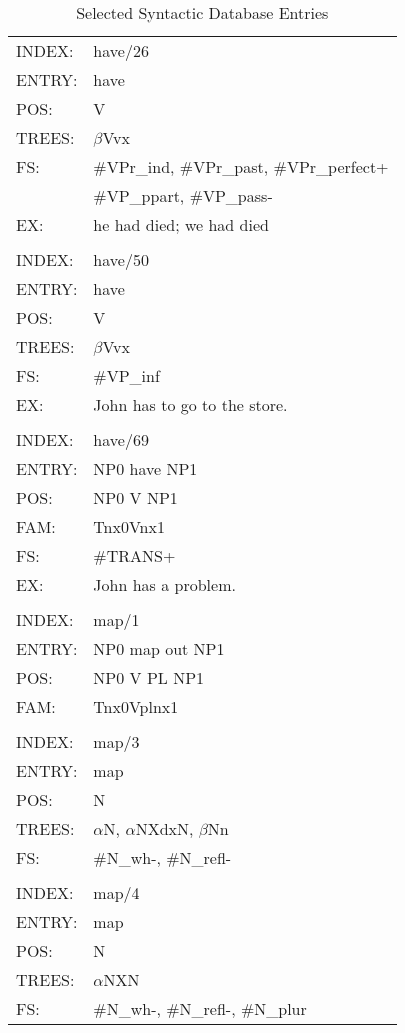 \begin{table}[ht]
\begin{tabular}{ll}

INDEX: & have/26 \\
ENTRY: & have \\
POS: & V \\
TREES:& $\beta$Vvx \\
FS:&\#VPr\_ind,  \#VPr\_past, \#VPr\_perfect+ \\ 
&  \#VP\_ppart,  \#VP\_pass- \\
EX:&he had died; we had died \\
\\
INDEX: & have/50 \\
ENTRY:& have \\ 
POS:& V \\ 
TREES:& $\beta$Vvx \\
FS:&\#VP\_inf  \\ 
EX:&John has to go to the store. \\
\\
INDEX:&have/69\\
ENTRY:&NP0 have NP1\\
POS:&NP0 V NP1 \\
FAM: &Tnx0Vnx1 \\
FS:&\#TRANS+ \\
EX:&John has a problem. \\
\\
INDEX:&map/1 \\
ENTRY:&NP0 map out NP1 \\
POS:&NP0 V PL NP1 \\
FAM: &Tnx0Vplnx1 \\
\\
INDEX:& map/3 \\
ENTRY:& map \\
POS: & N \\
TREES: & $\alpha$N,  $\alpha$NXdxN, $\beta$Nn \\
FS: & \#N\_wh-, \#N\_refl- \\
\\
INDEX: & map/4 \\
ENTRY: & map \\
POS: & N \\
TREES: & $\alpha$NXN \\
FS: & \#N\_wh-, \#N\_refl-, \#N\_plur \\
\end{tabular}	
\caption{Selected Syntactic Database Entries}
\label{syn-entries}
\end{table}

